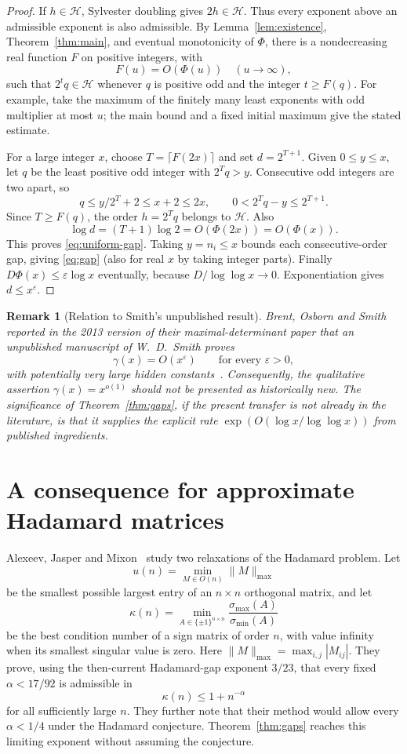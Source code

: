 \documentclass[11pt]{article}
\newtheorem{remark}[theorem]{Remark}
\newcommand{\Hcal}{\mathcal{H}}
\newcommand{\eps}{\varepsilon}
\newcommand{\scale}{\Phi}
\begin{document}
\begin{proof}
If $h\in\Hcal$, Sylvester doubling gives $2h\in\Hcal$. Thus every exponent
above an admissible exponent is also admissible. By Lemma~\ref{lem:existence},
Theorem~\ref{thm:main}, and eventual monotonicity of $\scale$, there is a
nondecreasing real function $F$ on positive integers, with
\[
F(u)=O(\scale(u))\quad(u\to\infty),
\]
such that $2^tq\in\Hcal$ whenever $q$ is positive odd and the integer
$t\ge F(q)$. For example, take the maximum of the finitely many least
exponents with odd multiplier at most $u$; the main bound and a fixed
initial maximum give the stated estimate.

For a large integer $x$, choose $T=\lceil F(2x)\rceil$ and set
$d=2^{T+1}$. Given $0\le y\le x$, let $q$ be the least positive odd
integer with $2^Tq>y$. Consecutive odd integers are two apart, so
\[
q\le y/2^T+2\le x+2\le2x,\qquad 0<2^Tq-y\le2^{T+1}.
\]
Since $T\ge F(q)$, the order $h=2^Tq$ belongs to $\Hcal$. Also
\[
\log d=(T+1)\log2=O(\scale(2x))=O(\scale(x)).
\]
This proves \eqref{eq:uniform-gap}. Taking $y=n_i\le x$ bounds each
consecutive-order gap, giving \eqref{eq:gap} (also for real $x$ by taking
integer parts). Finally $D\scale(x)\le\varepsilon\log x$ eventually,
because $D/\log\log x\to0$. Exponentiation gives $d\le x^{\varepsilon}$.
\end{proof}

\begin{remark}[Relation to Smith's unpublished result]
Brent, Osborn and Smith reported in the 2013 version of their maximal-determinant paper that an unpublished manuscript of W.~D.~Smith proves
\[
\gamma(x)=O(x^{\eps})\qquad\text{for every }\eps>0,
\]
with potentially very large hidden constants~\cite{Brent2013}.  Consequently, the qualitative assertion $\gamma(x)=x^{o(1)}$ should not be presented as historically new.  The significance of Theorem~\ref{thm:gaps}, if the present transfer is not already in the literature, is that it supplies the explicit rate
$\exp(O(\log x/\log\log x))$ from published ingredients.
\end{remark}

\section{A consequence for approximate Hadamard matrices}\label{sec:approx}
Alexeev, Jasper and Mixon~\cite{Alexeev2025} study two relaxations of the Hadamard problem.  Let
\[
u(n)=\min_{M\in O(n)}\|M\|_{\max}
\]
be the smallest possible largest entry of an $n\times n$ orthogonal matrix, and let
\[
\kappa(n)=\min_{A\in\{\pm1\}^{n\times n}}
\frac{\sigma_{\max}(A)}{\sigma_{\min}(A)}
\]
be the best condition number of a sign matrix of order $n$, with value infinity when its smallest singular value is zero. Here $\|M\|_{\max}=\max_{i,j}|M_{ij}|$.
They prove, using the then-current Hadamard-gap exponent $3/23$, that every fixed
$\alpha<17/92$ is admissible in
\[
\kappa(n)\le1+n^{-\alpha}
\]
for all sufficiently large $n$.  They further note that their method would allow every $\alpha<1/4$ under the Hadamard conjecture.  Theorem~\ref{thm:gaps} reaches this limiting exponent without assuming the conjecture.
\end{document}
